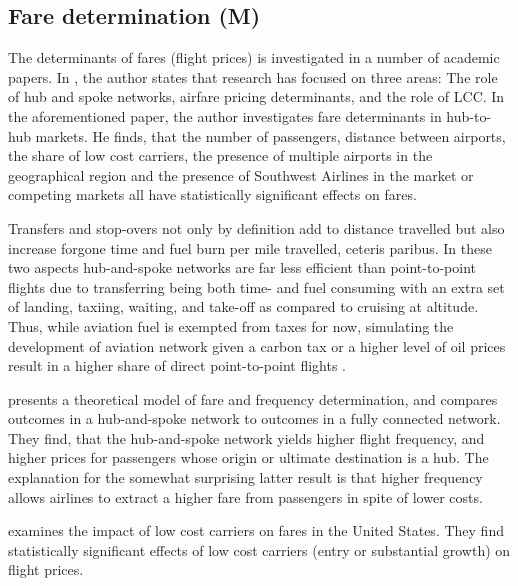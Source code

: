 \subsection{Fare determination (M)}
\label{subsec:b_fare}
The determinants of fares (flight prices) is investigated in a number of academic papers. In \citet{vowles2006airfare}, the author states that research has focused on three areas: The role of hub and spoke networks, airfare pricing determinants, and the role of LCC. In the aforementioned paper, the author investigates fare determinants in hub-to-hub markets. He finds, that the number of passengers, distance between airports, the share of low cost carriers, the presence of multiple airports in the geographical region and the presence of Southwest Airlines in the market or competing markets all have statistically significant effects on fares.
\par
Transfers and stop-overs not only by definition add to distance travelled but also increase forgone time and fuel burn per mile travelled, ceteris paribus. In these two aspects hub-and-spoke networks are far less efficient than point-to-point flights due to transferring being both time- and fuel consuming with an extra set of landing, taxiing, waiting, and take-off as compared to cruising at altitude. Thus, while aviation fuel is exempted from taxes for now, simulating the development of aviation network given a carbon tax or a higher level of oil prices result in a higher share of direct point-to-point flights \citep{o2012fuel}.
\par
\citet{brueckner2001model} presents a theoretical model of fare and frequency determination, and compares outcomes in a hub-and-spoke network to outcomes in a fully connected network. They find, that the hub-and-spoke network yields higher flight frequency, and higher prices for passengers whose origin or ultimate destination is a hub. The explanation for the somewhat surprising latter result is that higher frequency allows airlines to extract a higher fare from passengers in spite of lower costs.
\par
\citet{abda2012impacts} examines the impact of low cost carriers on fares in the United States. They find statistically significant effects of low cost carriers (entry or substantial growth) on flight prices.  

